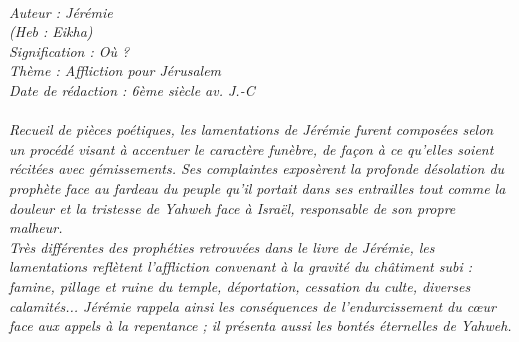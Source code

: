 \BFont
\noindent\hrulefill
{\footnotesize
\textit{
\bigskip
{\centering{}
\\Auteur : Jérémie
\\(Heb : Eikha)
\\Signification : Où ?
\\Thème : Affliction pour Jérusalem
\\Date de rédaction : 6ème siècle av. J.-C\\}
}
\textit{
\\Recueil de pièces poétiques,  les lamentations de Jérémie furent composées selon un procédé visant à accentuer le caractère funèbre, de façon à ce qu’elles soient récitées avec gémissements. Ses complaintes exposèrent la profonde désolation du prophète face au fardeau du peuple qu’il portait dans ses entrailles tout comme la douleur et la tristesse de Yahweh face à Israël, responsable de son propre malheur.
\\Très différentes des prophéties retrouvées dans le livre de Jérémie, les lamentations reflètent l’affliction convenant à la gravité du châtiment subi : famine, pillage et ruine du temple, déportation, cessation du culte, diverses calamités... Jérémie rappela ainsi les conséquences de l’endurcissement du cœur face aux appels à la repentance ; il présenta aussi les bontés éternelles de Yahweh.\bigskip
}
}
\par\nobreak\noindent\hrulefill
